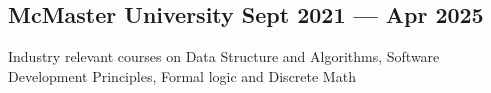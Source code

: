 
\subsection{{McMaster University \hfill Sept 2021 --- Apr 2025}}
\begin{zitemize}
\item Industry relevant courses on \hspace{0.05cm}Data Structure and Algorithms, Software Development Principles, Formal logic and Discrete Math

\end{zitemize}

\vspace{0.3cm}